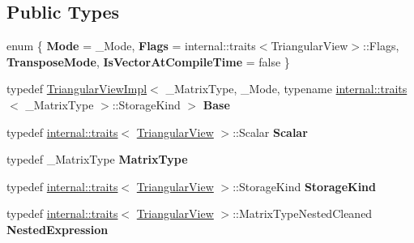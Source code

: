 \subsection*{Public Types}
\begin{DoxyCompactItemize}
\item 
\mbox{\label{class_eigen_1_1_triangular_view_ae4e4b9fd3acc47cfbe87b88bc424b923}} 
enum \{ {\bfseries Mode} = \+\_\+\+Mode, 
{\bfseries Flags} = internal\+::traits$<$Triangular\+View$>$\+::Flags, 
{\bfseries Transpose\+Mode}, 
{\bfseries Is\+Vector\+At\+Compile\+Time} = false
 \}
\item 
\mbox{\label{class_eigen_1_1_triangular_view_a9af1ba128fe6ff9c197fd384e5ebd38e}} 
typedef \mbox{\hyperlink{class_eigen_1_1_triangular_view_impl}{Triangular\+View\+Impl}}$<$ \+\_\+\+Matrix\+Type, \+\_\+\+Mode, typename \mbox{\hyperlink{struct_eigen_1_1internal_1_1traits}{internal\+::traits}}$<$ \+\_\+\+Matrix\+Type $>$\+::Storage\+Kind $>$ {\bfseries Base}
\item 
\mbox{\label{class_eigen_1_1_triangular_view_aebc3f888dab4b6241b0512a696e489e0}} 
typedef \mbox{\hyperlink{struct_eigen_1_1internal_1_1traits}{internal\+::traits}}$<$ \mbox{\hyperlink{class_eigen_1_1_triangular_view}{Triangular\+View}} $>$\+::Scalar {\bfseries Scalar}
\item 
\mbox{\label{class_eigen_1_1_triangular_view_add702d94e40cc9a747412cbce9fc4449}} 
typedef \+\_\+\+Matrix\+Type {\bfseries Matrix\+Type}
\item 
\mbox{\label{class_eigen_1_1_triangular_view_a2fc10136c8c41c6adcc66fd738071d1c}} 
typedef \mbox{\hyperlink{struct_eigen_1_1internal_1_1traits}{internal\+::traits}}$<$ \mbox{\hyperlink{class_eigen_1_1_triangular_view}{Triangular\+View}} $>$\+::Storage\+Kind {\bfseries Storage\+Kind}
\item 
\mbox{\label{class_eigen_1_1_triangular_view_a783f6a7ac444f0f19a00ef4391adb6a7}} 
typedef \mbox{\hyperlink{struct_eigen_1_1internal_1_1traits}{internal\+::traits}}$<$ \mbox{\hyperlink{class_eigen_1_1_triangular_view}{Triangular\+View}} $>$\+::Matrix\+Type\+Nested\+Cleaned {\bfseries Nested\+Expression}

\end{DoxyCompactItemize}
